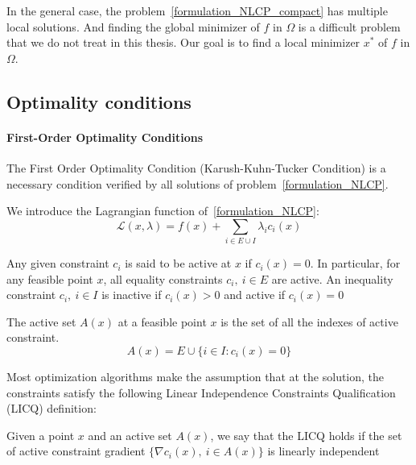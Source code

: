 In the general case, the problem~\ref{formulation_NLCP_compact} has multiple local solutions.
And finding the global minimizer of $f$ in $\Omega$ is a difficult problem that we do not treat in this thesis.
Our goal is to find a local minimizer $x^*$ of $f$ in $\Omega$.

\subsection{Optimality conditions}
\label{sub:optimality_conditions}

\paragraph{First-Order Optimality Conditions}

The First Order Optimality Condition (Karush-Kuhn-Tucker Condition) is a necessary condition verified by all solutions of problem~\ref{formulation_NLCP}.

We introduce the Lagrangian function of~\ref{formulation_NLCP}:
\begin{equation}
  \mathcal{L}(x,\lambda) = f(x) + \sum_{i\in E\cup I}\lambda_i c_i(x)
\end{equation}

Any given constraint $c_i$ is said to be active at $x$ if $c_i(x)=0$.
In particular, for any feasible point $x$, all equality constraints $c_i,\ i\in E$ are active.
An inequality constraint $c_i,\ i\in I$ is inactive if $c_i(x)>0$ and active if $c_i(x) = 0$

\begin{definition}
\label{active_set}
  The active set $\mathit{A}(x)$ at a feasible point $x$ is the set of all the indexes of active constraint.
  \begin{equation}
    \mathit{A}(x)=E\cup\{i\in I: c_i(x) = 0\}
  \end{equation}
\end{definition}

Most optimization algorithms make the assumption that at the solution, the constraints satisfy the following Linear Independence Constraints Qualification (LICQ) definition:

\begin{definition}
  Given a point $x$ and an active set $\mathit{A}(x)$, we say that the LICQ holds if the set of active constraint gradient $\{\nabla c_i(x),\ i\in \mathit{A}(x)\}$ is linearly independent
\end{definition}

